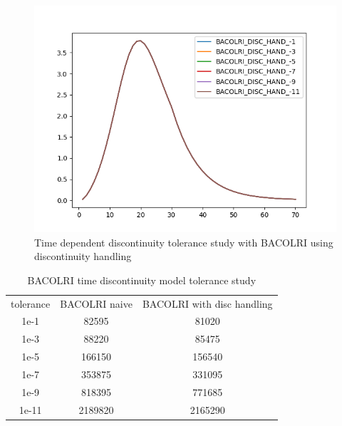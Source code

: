 \documentclass{article}
\begin{document}
\begin{figure}[H]
\centering
\includegraphics[width=0.7\linewidth]{./figures/pde_time_disc_bacolri_disc_hand_tol}
\caption{Time dependent discontinuity tolerance study with BACOLRI using discontinuity handling}
\label{fig:pde_time_disc_bacolri_disc_hand_tol}
\end{figure}

\begin{table}[h]
\caption {BACOLRI time discontinuity model tolerance study} 
\label{tab:BACOLRI_time_tolerance}
\begin{center}
\begin{tabular}{ c c c } 
tolerance  & BACOLRI naive & BACOLRI with disc handling\\ 
1e-1       & 82595        &   81020     \\
1e-3       & 88220        &   85475    \\
1e-5       & 166150       &   156540    \\
1e-7       & 353875       &   331095    \\
1e-9       & 818395       &   771685    \\
1e-11      & 2189820      &   2165290    \\
\end{tabular}
\end{center}
\end{table}
\end{document}
